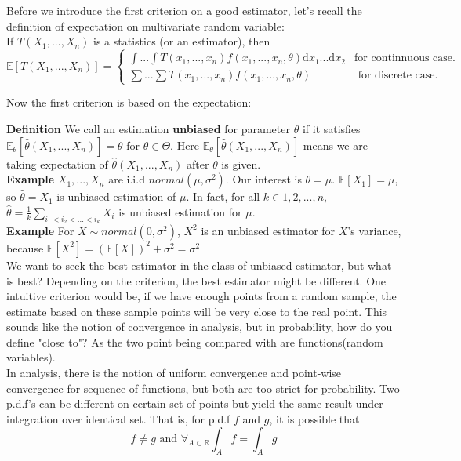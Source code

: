 \documentclass[a4paper,12pt]{article}
\begin{document}
Before we introduce the first criterion on a good estimator, let's recall the definition of expectation on multivariate random variable:\\ 

If $T(X_1, ..., X_n)$ is a statistics (or an estimator), then
$$
\mathbb{E}[T(X_1, ..., X_n)] =
\begin{cases}
\int...\int T(x_1, ..., x_n)f(x_1, ..., x_n, \theta) \mathrm{d}x_1...\mathrm{d}x_2 & \text{for continnuous case.}\\
\sum...\sum T(x_1, ..., x_n)f(x_1, ..., x_n, \theta) & \text{ for discrete case.}
\end{cases}
$$

Now the first criterion is based on the expectation:

\textbf{Definition} We call an estimation \textbf{unbiased} for parameter $\theta$ if it satisfies
$\mathbb{E}_\theta [\hat{\theta}( X_1, ..., X_n )] = \theta$ for $\theta \in \Theta$.
Here $\mathbb{E}_\theta [\hat{\theta}( X_1, ..., X_n )]$ means we are taking expectation of $\hat{\theta}( X_1, ..., X_n )$ after $\theta$ is given.\\


\textbf{Example} $X_1, ..., X_n$ are i.i.d $normal( \mu, \sigma^2 )$. Our interest is $\theta = \mu$. $\mathbb{E}[X_1] = \mu$, so $\hat{\theta} = X_1$ is unbiased estimation of $\mu$. In fact, for all $k \in 1, 2, ..., n$, $\hat{\theta} = \frac{1}{k}\sum_{i_1 < i_2 < ...< i_k}X_i$ is unbiased estimation for $\mu$.\\

\textbf{Example} For $X \sim normal(0, \sigma^2)$, $X^2$ is an unbiased estimator for $X$'s variance, because $\mathbb{E}[X^2] = (\mathbb{E}[X])^2 + \sigma^2 = \sigma^2$\\

We want to seek the best estimator in the class of unbiased estimator, but what is best? Depending on the criterion, the best estimator might be different. One intuitive criterion would be, if we have enough points from a random sample, the estimate based on these sample points will be very close to the real point. This sounds like the notion of convergence in analysis, but in probability, how do you define "close to"? As the two point being compared with are functions(random variables).\\

In analysis, there is the notion of uniform convergence and point-wise convergence for sequence of functions, but both are too strict for probability. Two p.d.f's can be different on certain set of points but yield the same result under integration over identical set. That is, for p.d.f $f$ and $g$, it is possible that
$$f \neq g \text{ and } \forall_{A\subset \mathbb{R}} \int_A f = \int_A g$$
\end{document}
